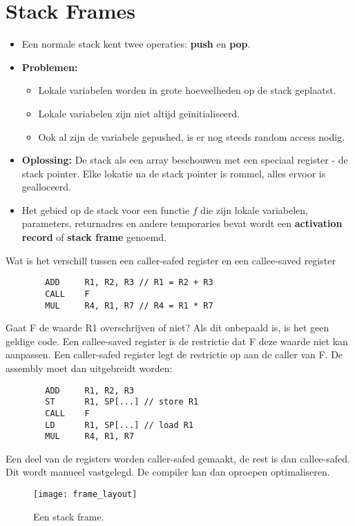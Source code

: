 \section{Stack Frames}
\begin{itemize}
	\item Een normale stack kent twee operaties: \textbf{push} en \textbf{pop}.
	\item \textbf{Problemen:}
	\begin{itemize}
		\item Lokale variabelen worden in grote hoeveelheden op de stack geplaatst. 
		\item Lokale variabelen zijn niet altijd geïnitialiseerd.
		\item Ook al zijn de variabele gepushed, is er nog steeds random access nodig.
	\end{itemize}  
	\item \textbf{Oplossing:} De stack als een array beschouwen met een speciaal register - de stack pointer. Elke lokatie na de stack pointer is rommel, alles ervoor is gealloceerd.
	\item Het gebied op de stack voor een functie $f$ die zijn lokale variabelen, parameters, returnadres en andere temporaries bevat wordt een \textbf{activation record} of \textbf{stack frame} genoemd.
\end{itemize}



Wat is het verschill tussen een caller-safed register en een callee-saved register

		\begin{lstlisting}
		ADD		R1, R2, R3 // R1 = R2 + R3
		CALL	F
		MUL		R4, R1, R7 // R4 = R1 * R7
		\end{lstlisting}
		Gaat F de waarde R1 overschrijven of niet? Als dit onbepaald is, is het geen geldige code. Een callee-saved register is de restrictie dat F deze waarde niet kan aanpassen. Een caller-safed register legt de restrictie op aan de caller van F. De assembly moet dan uitgebreidt worden:
		\begin{lstlisting}
		ADD		R1, R2, R3
		ST		R1, SP[...] // store R1 
		CALL	F
		LD      R1, SP[...] // load R1
		MUL		R4, R1, R7
		\end{lstlisting}
		Een deel van de registers worden caller-safed gemaakt, de rest is dan callee-safed. Dit wordt manueel vastgelegd. De compiler kan dan oproepen optimaliseren.



\begin{figure}
	\texttt{[image: frame\_layout]}
	\caption{Een stack frame.}
	\label{fig:stack_frame}
\end{figure}



